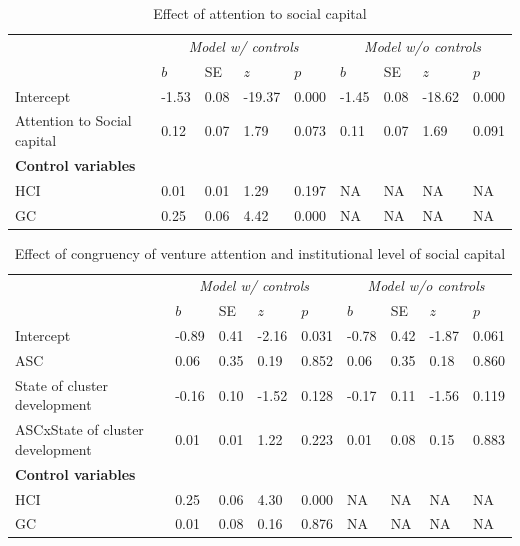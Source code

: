 \documentclass[
  english,
  man]{apa6}
\begin{document}
\begin{table}

\caption{\label{tab:unnamed-chunk-18}Effect of attention to social capital}
\centering
\begin{tabular}[t]{l|l|l|l|l|l|l|l|l}
\hline
\multicolumn{1}{c|}{\em{ }} & \multicolumn{4}{c|}{\em{Model w/ controls}} & \multicolumn{4}{c}{\em{Model w/o controls}} \\
\cline{2-5} \cline{6-9}
  & $b$ & SE & $z$ & $p$ & $b$ & SE & $z$ & $p$\\
\hline
Intercept & -1.53 & 0.08 & -19.37 & 0.000 & -1.45 & 0.08 & -18.62 & 0.000\\
\hline
Attention to Social capital & 0.12 & 0.07 & 1.79 & 0.073 & 0.11 & 0.07 & 1.69 & 0.091\\
\hline
\multicolumn{9}{l}{\textbf{Control variables}}\\
\hline
\hspace{1em}HCI & 0.01 & 0.01 & 1.29 & 0.197 & NA & NA & NA & NA\\
\hline
\hspace{1em}GC & 0.25 & 0.06 & 4.42 & 0.000 & NA & NA & NA & NA\\
\hline
\end{tabular}
\end{table}

\begin{table}

\caption{\label{tab:unnamed-chunk-18}Effect of congruency of venture attention and institutional level of social capital}
\centering
\begin{tabular}[t]{l|l|l|l|l|l|l|l|l}
\hline
\multicolumn{1}{c|}{\em{ }} & \multicolumn{4}{c|}{\em{Model w/ controls}} & \multicolumn{4}{c}{\em{Model w/o controls}} \\
\cline{2-5} \cline{6-9}
  & $b$ & SE & $z$ & $p$ & $b$ & SE & $z$ & $p$\\
\hline
Intercept & -0.89 & 0.41 & -2.16 & 0.031 & -0.78 & 0.42 & -1.87 & 0.061\\
\hline
ASC & 0.06 & 0.35 & 0.19 & 0.852 & 0.06 & 0.35 & 0.18 & 0.860\\
\hline
State of cluster development & -0.16 & 0.10 & -1.52 & 0.128 & -0.17 & 0.11 & -1.56 & 0.119\\
\hline
ASCxState of cluster development & 0.01 & 0.01 & 1.22 & 0.223 & 0.01 & 0.08 & 0.15 & 0.883\\
\hline
\multicolumn{9}{l}{\textbf{Control variables}}\\
\hline
\hspace{1em}HCI & 0.25 & 0.06 & 4.30 & 0.000 & NA & NA & NA & NA\\
\hline
\hspace{1em}GC & 0.01 & 0.08 & 0.16 & 0.876 & NA & NA & NA & NA\\
\hline
\end{tabular}
\end{table}
\end{document}
